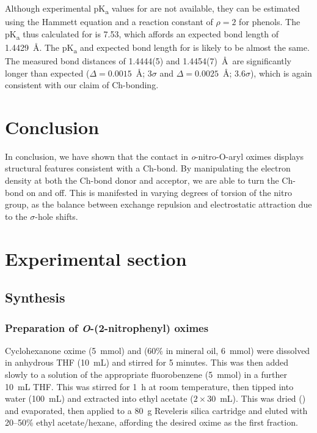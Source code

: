 \begin{refsection}
Although experimental pK\textsubscript{a} values for  are not available, they can be estimated using the Hammett equation and a reaction constant of $\rho=2$ for phenols.\autocite{Hansch1991}
The pK\textsubscript{a} thus calculated for  is 7.53, which affords an expected bond length of 1.4429~\AA.\@
The pK\textsubscript{a} and expected bond length for  is likely to be almost the same.
The measured bond distances of 1.4444(5) and 1.4454(7)~\AA\ are significantly longer than expected ($\Delta = 0.0015$~\AA{}; 3$\sigma$ and $\Delta = 0.0025$~\AA{}; 3.6$\sigma$), which is again consistent with our claim of Ch-bonding.

\section{Conclusion}

In conclusion, we have shown that the  contact in \textit{o}-nitro-O-aryl oximes displays structural features consistent with a Ch-bond.
By manipulating the electron density at both the Ch-bond donor and acceptor, we are able to turn the Ch-bond on and off.
This is manifested in varying degrees of torsion of the nitro group, as the balance between exchange repulsion and electrostatic attraction due to the $\sigma$-hole shifts.

\section{Experimental section}

\subsection{Synthesis}

\subsubsection[Preparation of \refcmpd{cyclohexanone-oxime-2np,cyclohexanone-oxime-2n.5nme2p,cyclohexanone-oxime-2n.5mp}]{Preparation of \emph{O}-(2-nitrophenyl) oximes }
Cyclohexanone oxime (5~mmol) and  (60\% in mineral oil, 6~mmol) were dissolved in anhydrous THF (10~mL) and stirred for 5 minutes.
This was then added slowly to a solution of the appropriate fluorobenzene (5~mmol) in a further 10~mL THF.\@
This was stirred for 1~h at room temperature, then tipped into water (100~mL) and extracted into ethyl acetate ($2\times30$~mL).
This was dried () and evaporated, then applied to a 80~g Reveleris silica cartridge and eluted with 20--50\% ethyl acetate/hexane, affording the desired oxime as the first fraction.


\end{refsection}

